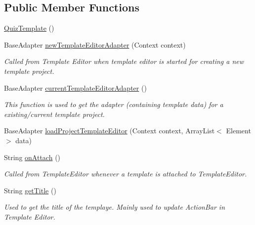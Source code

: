 \subsection*{Public Member Functions}
\begin{DoxyCompactItemize}
\item 
\hyperlink{classorg_1_1buildmlearn_1_1toolkit_1_1templates_1_1QuizTemplate_a564252fd818d44d1f9d2221f58f3eec5}{Quiz\-Template} ()
\item 
Base\-Adapter \hyperlink{classorg_1_1buildmlearn_1_1toolkit_1_1templates_1_1QuizTemplate_a47d3029ad563737e60c7c209738b0a71}{new\-Template\-Editor\-Adapter} (Context context)
\begin{DoxyCompactList}\small\item\em Called from Template Editor when template editor is started for creating a new template project. \end{DoxyCompactList}\item 
Base\-Adapter \hyperlink{classorg_1_1buildmlearn_1_1toolkit_1_1templates_1_1QuizTemplate_ab1d89e08da401108f6a6ec7bf208c973}{current\-Template\-Editor\-Adapter} ()
\begin{DoxyCompactList}\small\item\em This function is used to get the adapter (containing template data) for a existing/current template project. \end{DoxyCompactList}\item 
Base\-Adapter \hyperlink{classorg_1_1buildmlearn_1_1toolkit_1_1templates_1_1QuizTemplate_a546b1ec5e027883034daa14ef725c4ff}{load\-Project\-Template\-Editor} (Context context, Array\-List$<$ Element $>$ data)
\item 
String \hyperlink{classorg_1_1buildmlearn_1_1toolkit_1_1templates_1_1QuizTemplate_a775355616317bb56fd8adf0962d7e05b}{on\-Attach} ()
\begin{DoxyCompactList}\small\item\em Called from Template\-Editor whenever a template is attached to Template\-Editor. \end{DoxyCompactList}\item 
String \hyperlink{classorg_1_1buildmlearn_1_1toolkit_1_1templates_1_1QuizTemplate_a69f511c03a64a4945ffb41339666fcaa}{get\-Title} ()
\begin{DoxyCompactList}\small\item\em Used to get the title of the templaye. Mainly used to update Action\-Bar in Template Editor. \end{DoxyCompactList}\item 

\end{DoxyCompactItemize}
